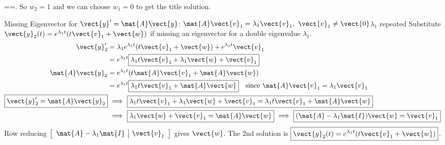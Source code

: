 \documentclass[11pt,aspectratio=169]{beamer}
\begin{document}
\begin{frame}
\begin{itemize}
=
=\left[\begin{array}{cc|c}0&1&1\\0&0&0\end{array}\right]\).
\newline 
So \(w_2=1\) and we can choose \(w_1=0\) to get the title solution. 
\end{itemize}
\end{frame}

\begin{frame}{Missing Eigenvector for \(\vect{y}'=\mat{A}\vect{y}\):
\quad  \(\mat{A}\vect{v}_1=\lambda_1\vect{v}_1,\ \vect{v}_1\ne\vect{0}\)\quad \(\lambda_1\) repeated}
Substitute 
\(\vect{y}_2(t)=e^{\lambda_1 t}(t\vect{v}_1+\vect{w})\)
if missing an eigenvector for a double eigenvalue $\lambda_1$.
\[
\begin{aligned}
\vect{y}_2'
 &=\lambda_1 e^{\lambda_1 t}(t\vect{v}_1+\vect{w})
   +e^{\lambda_1 t}\vect{v}_1\\
 &=e^{\lambda_1 t}\boxed{\lambda_1 t\vect{v}_1+\lambda_1\vect{w}+\vect{v}_1}\\
\mat{A}\vect{y}_2
 &=e^{\lambda_1 t}(t\mat{A}\vect{v}_1+\mat{A}\vect{w})\\
 &=e^{\lambda_1 t}\boxed{\lambda_1 t\vect{v}_1+\mat{A}\vect{w}}
 \quad\text{since }\mat{A}\vect{v}_1=\lambda_1\vect{v}_1\\
\boxed{\vect{y}_2'=\mat{A}\vect{y}_2}
 &\ \Longrightarrow\
 \boxed{\lambda_1 t\vect{v}_1+\lambda_1\vect{w}+\vect{v}_1
 =\lambda_1 t\vect{v}_1+\mat{A}\vect{w}}\\
 &\ \Longrightarrow\ \boxed{\lambda_1\vect{w}+\vect{v}_1=\mat{A}\vect{w}}
 \ \Longrightarrow\ \boxed{(\mat{A}-\lambda_1\mat{I})\vect{w}=\vect{v}_1}
\end{aligned}
\]
Row reducing \(\left[\begin{array}{c|c}\mat{A}-\lambda_1\mat{I}&\vect{v}_1\end{array}\right]\)
gives \(\vect{w}\). The 2nd solution is
\(\boxed{\vect{y}_2(t)=e^{\lambda_1 t}(t\vect{v}_1+\vect{w})}\).
\end{frame}
\end{document}
